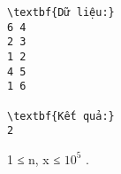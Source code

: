 \begin{verbatim}
\textbf{Dữ liệu:}
6 4
2 3
1 2
4 5
1 6

\textbf{Kết quả:}
2
\end{verbatim}
1 ≤ n, x ≤ $10^{5}$ .